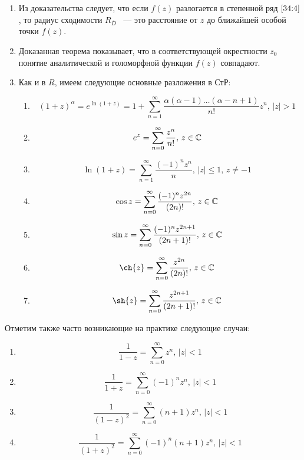 \documentclass[../../main.tex]{subfiles}
\begin{document}
\begin{rem}
	\begin{enumerate}
		\item Из доказательства следует, что если $ f(z) $ разлогается в степенной 
		ряд $ \eqref{34:4} $, то радиус сходимости $ R_{\overline{D}} $ ~--- это 
		расстояние от $ z $ до ближайшей особой точки $ f(z) $.
		
		\item Доказанная теорема показывает, что в соответствующей окрестности $ z_0 
		$ понятие аналитической и голоморфной функции $f(z)$ совпадают.
		
		\item Как и в $R$, имеем следующие основные разложения в СтР:
		
		\begin{enumerate}
			\item \[ (1 + z)^\alpha = e^{\ln(1 + z)} = 1 + \sum\limits_{n = 1}^{\infty} 
			\frac{\alpha(\alpha - 1) \ldots (\alpha - n +1)}{n!}z^n,\, |z| > 1 \]
			
			\item \[ e^z = \sum\limits_{n = 0}^{\infty} \frac{z^n}{n!},\, z \in \mathbb{C} \]
			
			\item \[ \ln(1 + z) = \sum\limits_{n = 1}^{\infty} \frac{(-1)^nz^n}{n},\, 
			|z| \leq 1,\, z \neq -1 \]
			
			\item \[ \cos{z} = \sum\limits_{n = 0}^{\infty} 
			\frac{(-1)^nz^{2n}}{(2n)!},\, z \in \mathbb{C} \]
			
			\item \[ \sin{z} = \sum\limits_{n = 0}^{\infty} \frac{(-1)^nz^{2n + 1}}{(2n 
			+ 1)!},\, z \in \mathbb{C} \]
			
			\item \[ \ch{z} = \sum\limits_{n = 0}^{\infty} \frac{z^{2n}}{(2n)!},\, z 
			\in \C \]
			
			\item \[ \sh{z} = \sum\limits_{n = 0}^{\infty} \frac{z^{2n + 1}}{(2n + 
			1)!},\, z \in \C \]
		\end{enumerate}
	\end{enumerate}
\end{rem}

Отметим также часто возникающие на практике следующие случаи:

\begin{enumerate}
	\item \[ \frac{1}{1 - z} = \sum\limits_{n = 0}^{\infty} z^n,\, |z| < 1 \]
	
	\item \[ \frac{1}{1 + z} = \sum\limits_{n = 0}^{\infty} (-1)^nz^n,\, |z| < 1 
	\]

	\item \[ \frac{1}{(1 - z)^2} = \sum\limits_{n = 0}^{\infty} (n + 1)z^n,\, |z| 
	< 1 \]
	
	\item \[ \frac{1}{(1 + z)^2} = \sum\limits_{n = 0}^{\infty} (-1)^n(n + 
	1)z^n,\, |z| < 1 \]
\end{enumerate}
\end{document}
